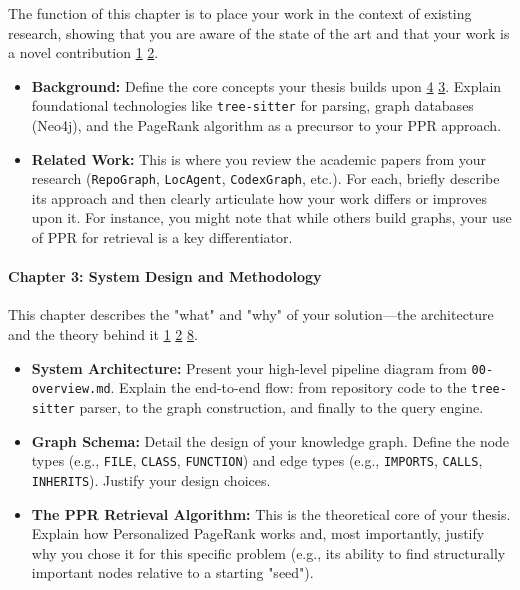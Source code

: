 \documentclass{article}
\begin{document}
The function of this chapter is to place your work in the context of existing research, showing that you are aware of the state of the art and that your work is a novel contribution \hyperref[ref:1]{1} \hyperref[ref:2]{2}.

\begin{itemize}
\item \textbf{Background:} Define the core concepts your thesis builds upon \hyperref[ref:4]{4} \hyperref[ref:3]{3}. Explain foundational technologies like \texttt{tree-sitter} for parsing, graph databases (Neo4j), and the PageRank algorithm as a precursor to your PPR approach.


\item \textbf{Related Work:} This is where you review the academic papers from your research (\texttt{RepoGraph}, \texttt{LocAgent}, \texttt{CodexGraph}, etc.). For each, briefly describe its approach and then clearly articulate how your work differs or improves upon it. For instance, you might note that while others build graphs, your use of PPR for retrieval is a key differentiator.


\end{itemize}

\paragraph{\textbf{Chapter 3: System Design and Methodology}}

This chapter describes the "what" and "why" of your solution---the architecture and the theory behind it \hyperref[ref:1]{1} \hyperref[ref:2]{2} \hyperref[ref:8]{8}.

\begin{itemize}
\item \textbf{System Architecture:} Present your high-level pipeline diagram from \texttt{00-overview.md}. Explain the end-to-end flow: from repository code to the \texttt{tree-sitter} parser, to the graph construction, and finally to the query engine.


\item \textbf{Graph Schema:} Detail the design of your knowledge graph. Define the node types (e.g., \texttt{FILE}, \texttt{CLASS}, \texttt{FUNCTION}) and edge types (e.g., \texttt{IMPORTS}, \texttt{CALLS}, \texttt{INHERITS}). Justify your design choices.


\item \textbf{The PPR Retrieval Algorithm:} This is the theoretical core of your thesis. Explain how Personalized PageRank works and, most importantly, justify why you chose it for this specific problem (e.g., its ability to find structurally important nodes relative to a starting "seed").


\end{itemize}
\end{document}
